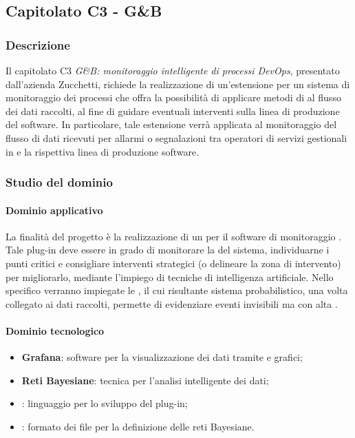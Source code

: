 	\subsection{Capitolato C3 - G\&B}
	
	\subsubsection{Descrizione}
	Il capitolato C3 \emph{G\&B: monitoraggio intelligente di processi DevOps}, presentato dall'azienda Zucchetti, richiede la realizzazione di un'estensione per un sistema di monitoraggio dei processi  che offra la possibilità di applicare metodi di  al flusso dei dati raccolti, al fine di guidare eventuali interventi sulla linea di produzione del software. In particolare, tale estensione verrà applicata al monitoraggio del flusso di dati ricevuti per allarmi o segnalazioni tra operatori di servizi gestionali in  e la rispettiva linea di produzione software.
	
	\subsubsection{Studio del dominio}
	\paragraph{Dominio applicativo} \Spazio 
	La finalità del progetto è la realizzazione di un  per il software di monitoraggio . Tale plug-in deve essere in grado di monitorare la  del sistema, individuarne i punti critici e consigliare  interventi strategici (o  delineare la zona di intervento) per migliorarlo, mediante l'impiego di tecniche di intelligenza artificiale. Nello specifico verranno impiegate le , il cui risultante sistema probabilistico, una volta collegato ai dati raccolti, permette di evidenziare eventi invisibili ma con alta .
	\paragraph{Dominio tecnologico}
	\begin{itemize}
		\item\textbf{{Grafana}}: software per la visualizzazione dei dati tramite  e grafici;
		\item\textbf{{Reti Bayesiane}}: tecnica per l'analisi intelligente dei dati;
		\item\textbf{{}}: linguaggio per lo sviluppo del plug-in;
		\item\textbf{{}}: formato dei file per la definizione delle reti Bayesiane.
	\end{itemize}
	
